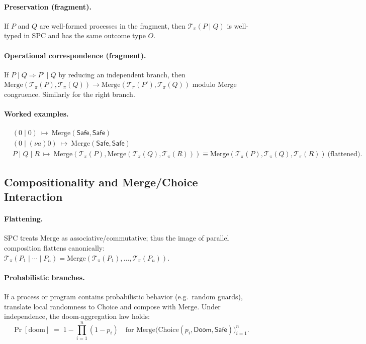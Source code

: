 \documentclass{article}
\begin{document}
\paragraph{Preservation (fragment).}
If $P$ and $Q$ are well-formed processes in the fragment, then
$\mathcal{T}_\pi(P \mid Q)$ is well-typed in SPC and has the same outcome type $O$.

\paragraph{Operational correspondence (fragment).}
If $P \mid Q \Rightarrow P' \mid Q$ by reducing an independent branch, then
$\mathrm{Merge}(\mathcal{T}_\pi(P),\mathcal{T}_\pi(Q)) \to
 \mathrm{Merge}(\mathcal{T}_\pi(P'),\mathcal{T}_\pi(Q))$
modulo Merge congruence. Similarly for the right branch.

\paragraph{Worked examples.}
\[
\begin{aligned}
&(0 \mid 0) \ \mapsto\ \mathrm{Merge}(\mathsf{Safe},\mathsf{Safe}) \\
&(0 \mid (\nu a)0) \ \mapsto\ \mathrm{Merge}(\mathsf{Safe},\mathsf{Safe}) \\
&P \mid Q \mid R\ \mapsto\ \mathrm{Merge}(\mathcal{T}_\pi(P),\mathrm{Merge}(\mathcal{T}_\pi(Q),\mathcal{T}_\pi(R))) \equiv
\mathrm{Merge}(\mathcal{T}_\pi(P),\mathcal{T}_\pi(Q),\mathcal{T}_\pi(R))\ \text{(flattened).}
\end{aligned}
\]

\subsection{Compositionality and Merge/Choice Interaction}

\paragraph{Flattening.}
SPC treats $\mathrm{Merge}$ as associative/commutative; thus the image of parallel
composition flattens canonically: $\mathcal{T}_\pi(P_1 \mid \cdots \mid P_n) =
\mathrm{Merge}(\mathcal{T}_\pi(P_1),\dots,\mathcal{T}_\pi(P_n))$.

\paragraph{Probabilistic branches.}
If a process or program contains probabilistic behavior (e.g.\ random guards),
translate local randomness to $\mathrm{Choice}$ and compose with $\mathrm{Merge}$.
Under independence, the doom-aggregation law holds:
\[
\Pr[\text{doom}] \;=\; 1 - \prod_{i=1}^n (1-p_i) \quad
\text{for } \mathrm{Merge}\big(\mathrm{Choice}(p_i,\mathsf{Doom},\mathsf{Safe})\big)_{i=1}^n.
\]
\end{document}
